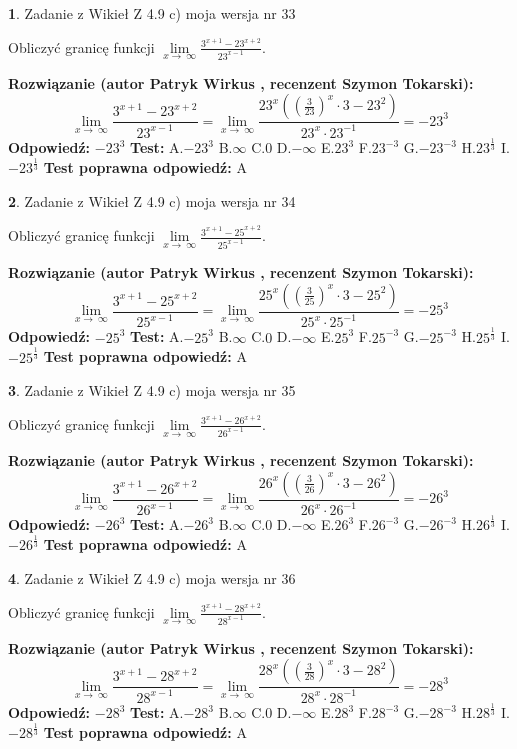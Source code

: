 \documentclass[12pt, a4paper]{article}
\theoremstyle{definition} %
\newtheorem{zad}{}
\newcommand{\zadStart}[1]{\begin{zad}#1\newline}
\newcommand{\zadStop}{\end{zad}}
\newcommand{\rozwStart}[2]{\noindent \textbf{Rozwiązanie (autor #1 , recenzent #2): }\newline}
\newcommand{\rozwStop}{\newline}
\newcommand{\odpStart}{\noindent \textbf{Odpowiedź:}\newline}
\newcommand{\odpStop}{\newline}
\newcommand{\testStart}{\noindent \textbf{Test:}\newline}
\newcommand{\testStop}{\newline}
\newcommand{\kluczStart}{\noindent \textbf{Test poprawna odpowiedź:}\newline}
\newcommand{\kluczStop}{\newline}
\begin{document}
\zadStart{Zadanie z Wikieł Z 4.9 c) moja wersja nr 33}


Obliczyć granicę funkcji  $\lim\limits_{x\to\ \infty}\frac{3^{x+1}-23^{x+2}}{23^{x-1}}$.
\zadStop
\rozwStart{Patryk Wirkus}{Szymon Tokarski}
$$\lim\limits_{x\to\ \infty}\frac{3^{x+1}-23^{x+2}}{23^{x-1}}=\lim\limits_{x\to\ \infty}\frac{23^{x}((\frac{3}{23})^{x}\cdot 3 -23^{2})}{23^{x}\cdot 23^{-1}} = -23^{3}$$
\rozwStop
\odpStart
$-23^{3}$
\odpStop
\testStart
A.$-23^{3}$ B.$\infty$ C.$0$ D.$-\infty$ E.$23^{3}$
F.$23^{-3}$ G.$-23^{-3}$
H.$23^{\frac{1}{3}}$
I.$-23^{\frac{1}{3}}$
\testStop
\kluczStart
A
\kluczStop



\zadStart{Zadanie z Wikieł Z 4.9 c) moja wersja nr 34}


Obliczyć granicę funkcji  $\lim\limits_{x\to\ \infty}\frac{3^{x+1}-25^{x+2}}{25^{x-1}}$.
\zadStop
\rozwStart{Patryk Wirkus}{Szymon Tokarski}
$$\lim\limits_{x\to\ \infty}\frac{3^{x+1}-25^{x+2}}{25^{x-1}}=\lim\limits_{x\to\ \infty}\frac{25^{x}((\frac{3}{25})^{x}\cdot 3 -25^{2})}{25^{x}\cdot 25^{-1}} = -25^{3}$$
\rozwStop
\odpStart
$-25^{3}$
\odpStop
\testStart
A.$-25^{3}$ B.$\infty$ C.$0$ D.$-\infty$ E.$25^{3}$
F.$25^{-3}$ G.$-25^{-3}$
H.$25^{\frac{1}{3}}$
I.$-25^{\frac{1}{3}}$
\testStop
\kluczStart
A
\kluczStop



\zadStart{Zadanie z Wikieł Z 4.9 c) moja wersja nr 35}


Obliczyć granicę funkcji  $\lim\limits_{x\to\ \infty}\frac{3^{x+1}-26^{x+2}}{26^{x-1}}$.
\zadStop
\rozwStart{Patryk Wirkus}{Szymon Tokarski}
$$\lim\limits_{x\to\ \infty}\frac{3^{x+1}-26^{x+2}}{26^{x-1}}=\lim\limits_{x\to\ \infty}\frac{26^{x}((\frac{3}{26})^{x}\cdot 3 -26^{2})}{26^{x}\cdot 26^{-1}} = -26^{3}$$
\rozwStop
\odpStart
$-26^{3}$
\odpStop
\testStart
A.$-26^{3}$ B.$\infty$ C.$0$ D.$-\infty$ E.$26^{3}$
F.$26^{-3}$ G.$-26^{-3}$
H.$26^{\frac{1}{3}}$
I.$-26^{\frac{1}{3}}$
\testStop
\kluczStart
A
\kluczStop



\zadStart{Zadanie z Wikieł Z 4.9 c) moja wersja nr 36}


Obliczyć granicę funkcji  $\lim\limits_{x\to\ \infty}\frac{3^{x+1}-28^{x+2}}{28^{x-1}}$.
\zadStop
\rozwStart{Patryk Wirkus}{Szymon Tokarski}
$$\lim\limits_{x\to\ \infty}\frac{3^{x+1}-28^{x+2}}{28^{x-1}}=\lim\limits_{x\to\ \infty}\frac{28^{x}((\frac{3}{28})^{x}\cdot 3 -28^{2})}{28^{x}\cdot 28^{-1}} = -28^{3}$$
\rozwStop
\odpStart
$-28^{3}$
\odpStop
\testStart
A.$-28^{3}$ B.$\infty$ C.$0$ D.$-\infty$ E.$28^{3}$
F.$28^{-3}$ G.$-28^{-3}$
H.$28^{\frac{1}{3}}$
I.$-28^{\frac{1}{3}}$
\testStop
\kluczStart
A
\kluczStop
\end{document}
